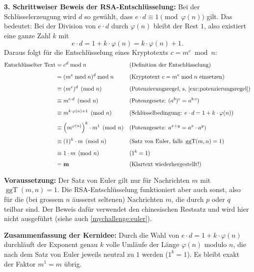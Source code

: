 \begin{myexcursion}
	\textbf{3. Schrittweiser Beweis der \gls{RSA}-Entschlüsselung:}
	Bei der Schlüsselerzeugung wird $d$ so gewählt, dass $e \cdot d \equiv 1 \pmod{\varphi(n)}$ gilt. Das bedeutet: Bei der Division von $e \cdot d$ durch $\varphi(n)$ bleibt der Rest $1$, also existiert eine ganze Zahl $k$ mit
	\[
		e \cdot d = 1 + k \cdot \varphi(n) = k \cdot \varphi(n) + 1.
	\]
	Daraus folgt für die Entschlüsselung eines Kryptotexts $c = m^e \bmod n$:
	\begin{align*}
		\text{Entschlüsselter Text}
		  & = c^d \bmod n                                          && (\text{Definition der Entschlüsselung}) \\[0.4em]
		  & = (m^e \bmod n)^d \bmod n                              && (\text{Kryptotext } c = m^e \bmod n \text{ einsetzen}) \\[0.4em]
		  & \equiv (m^e)^d \pmod n                                 && (\text{Potenzierungsregel, s.~\cref{exc:potenzierungsregel}}) \\[0.4em]
		  & \equiv m^{e \cdot d} \pmod n                           && (\text{Potenzgesetz: } (a^b)^c = a^{b \cdot c}) \\[0.4em]
		  & \equiv m^{k \cdot \varphi(n) + 1} \pmod n              && (\text{Schlüsselbedingung: } e \cdot d = 1 + k \cdot \varphi(n)) \\[0.4em]
		  & \equiv \left(m^{\varphi(n)}\right)^k \cdot m^1 \pmod n && (\text{Potenzgesetz: } a^{x+y} = a^x \cdot a^y) \\[0.4em]
		  & \equiv (1)^k \cdot m \pmod n                           && (\text{Satz von Euler, falls } \operatorname{ggT}(m, n) = 1) \\[0.4em]
		  & \equiv 1 \cdot m \pmod n                               && (1^k = 1) \\[0.4em]
		  & = \mathbf{m}                                           && (\text{Klartext wiederhergestellt!})
	\end{align*}

	\textbf{Voraussetzung:} Der Satz von Euler gilt nur für Nachrichten $m$ mit $\operatorname{ggT}(m, n) = 1$. Die \gls{RSA}-Entschlüsselung funktioniert aber auch sonst, also für die (bei grossem $n$ äusserst seltenen) Nachrichten $m$, die durch $p$ oder $q$ teilbar sind. Der Beweis dafür verwendet den chinesischen Restsatz und wird hier nicht ausgeführt (siehe auch \cref{mychallenge:euler}).

	\textbf{Zusammenfassung der Kernidee:} Durch die Wahl von $e \cdot d = 1 + k \cdot \varphi(n)$ durchläuft der Exponent genau $k$ volle Umläufe der Länge $\varphi(n)$ modulo $n$, die nach dem Satz von Euler jeweils neutral zu $1$ werden ($1^k = 1$). Es bleibt exakt der Faktor $m^1 = m$ übrig.
\end{myexcursion}

